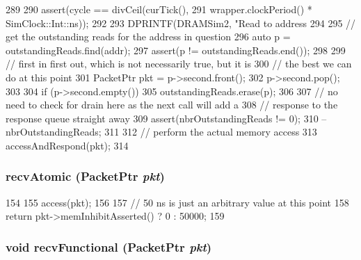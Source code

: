 \begin{DoxyCode}
289 {
290     assert(cycle == divCeil(curTick(),
291                             wrapper.clockPeriod() * SimClock::Int::ns));
292 
293     DPRINTF(DRAMSim2, "Read to address %
294 
295     // get the outstanding reads for the address in question
296     auto p = outstandingReads.find(addr);
297     assert(p != outstandingReads.end());
298 
299     // first in first out, which is not necessarily true, but it is
300     // the best we can do at this point
301     PacketPtr pkt = p->second.front();
302     p->second.pop();
303 
304     if (p->second.empty())
305         outstandingReads.erase(p);
306 
307     // no need to check for drain here as the next call will add a
308     // response to the response queue straight away
309     assert(nbrOutstandingReads != 0);
310     --nbrOutstandingReads;
311 
312     // perform the actual memory access
313     accessAndRespond(pkt);
314 }
\end{DoxyCode}
\hypertarget{classDRAMSim2_a5f0b4c4a94f6b0053f9d7a4eb9c2518a}{
\subsubsection[{recvAtomic}]{ recvAtomic ({\bf PacketPtr} {\em pkt})}}
\label{classDRAMSim2_a5f0b4c4a94f6b0053f9d7a4eb9c2518a}



\begin{DoxyCode}
154 {
155     access(pkt);
156 
157     // 50 ns is just an arbitrary value at this point
158     return pkt->memInhibitAsserted() ? 0 : 50000;
159 }
\end{DoxyCode}
\hypertarget{classDRAMSim2_aeefa907fb6d6a787e6dab90e8138ea90}{
\subsubsection[{recvFunctional}]{\setlength{\rightskip}{0pt plus 5cm}void recvFunctional ({\bf PacketPtr} {\em pkt})}}
\label{classDRAMSim2_aeefa907fb6d6a787e6dab90e8138ea90}



